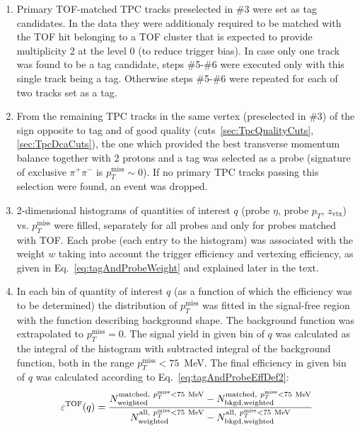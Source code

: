 \begin{enumerate}
 \item Primary TOF-matched TPC tracks preselected in \#3 were set as tag candidates. In the data they were additionaly required to be matched with the TOF hit belonging to a TOF cluster that is expected to provide multiplicity 2 at the level 0 (to reduce trigger bias). In case only one track was found to be a tag candidate, steps \#5-\#6 were executed only with this single track being a tag. Otherwise steps \#5-\#6 were repeated for each of two tracks set as a tag.\\[-20pt]%
 \item From the remaining TPC tracks in the same vertex (preselected in \#3) of the sign opposite to tag and of good quality (cuts~\ref{sec:TpcQualityCuts},\ref{sec:TpcDcaCuts}), the one which provided the best transverse momentum balance together with 2 protons and a tag was selected as a probe (signature of exclusive $\pi^{+}\pi^{-}$ is  $p_{T}^{\text{miss}}\sim0$). If no primary TPC tracks passing this selection were found, an event was dropped.\\[-20pt]%
 \item 2-dimensional histograms of quantities of interest $q$ (probe $\eta$, probe $p_{T}$, $z_{\text{vtx}}$) vs. $p_{T}^{\text{miss}}$ were filled, separately for all probes and only for probes matched with TOF. Each probe (each entry to the histogram) was associated with the weight $w$ taking into account the trigger efficiency and vertexing efficiency, as given in Eq.~\eqref{eq:tagAndProbeWeight} and explained later in the text.\\[-20pt]%
 \item In each bin of quantity of interest $q$ (as a function of which the efficiency was to be determined) the distribution of $p_{T}^{\text{miss}}$ was fitted in the signal-free region with the function describing background shape. The background function was extrapolated to $p_{T}^{\text{miss}}=0$. The signal yield in given bin of $q$ was calculated as the integral of the histogram with subtracted integral of the background function, both in the range $p_{T}^{\text{miss}}<75$~MeV. The final efficiency in given bin of $q$ was calculated according to Eq.~\eqref{eq:tagAndProbeEffDef2}:%
 \begin{equation}\label{eq:tagAndProbeEffDef2}
  \varepsilon^{\text{TOF}}(q) = \frac{N_\text{weighted}^{\text{matched},~p_{T}^{\text{miss}}<75~\text{MeV}} - N_\text{bkgd,weighted}^{\text{matched},~p_{T}^{\text{miss}}<75~\text{MeV}} }{ N_\text{weighted}^{\text{all},~p_{T}^{\text{miss}}<75~\text{MeV}} - N_\text{bkgd,weighted}^{\text{all},~p_{T}^{\text{miss}}<75~\text{MeV}} }\vspace*{-25pt}
 \end{equation}
\end{enumerate}
